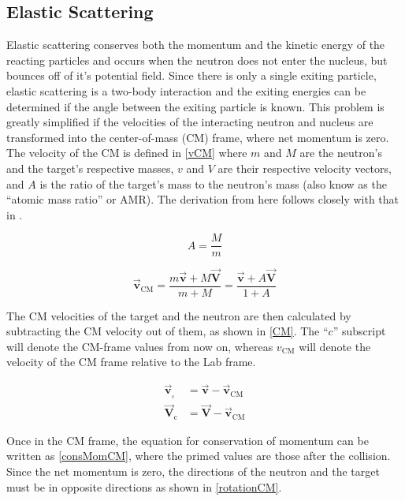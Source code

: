 \subsection{Elastic Scattering}

Elastic scattering conserves both the momentum and the kinetic energy of the reacting particles and occurs when the neutron does not enter the nucleus, but bounces off of it's potential field.  Since there is only a single exiting particle, elastic scattering is a two-body interaction and the exiting energies can be determined if the angle between the exiting particle is known.  This problem is greatly simplified if the velocities of the interacting neutron and nucleus are transformed into the center-of-mass (CM) frame, where net momentum is zero. The velocity of the CM is defined in \eqref{vCM} where $m$ and $M$ are the neutron's and the target's respective masses, $v$ and $V$ are their respective velocity vectors, and $A$ is the ratio of the target's mass to the neutron's mass (also know as the ``atomic mass ratio'' or AMR).  The derivation from here follows closely with that in \cite{jaakko}.

\begin{equation}
A = \frac{M}{m}
\label{AWR}
\end{equation}

\begin{equation}
\boldsymbol{\vec{v}_{\mathrm{CM}}} = \frac{ m \boldsymbol{\vec{v}} + M \boldsymbol{\vec{V}} }    {m+M} = \frac{ \boldsymbol{\vec{v}} + A \boldsymbol{\vec{V}} }    {1+A}
\label{vCM}
\end{equation}

The CM velocities of the target and the neutron are then calculated by subtracting the CM velocity out of them, as shown in \eqref{CM}.  The ``$c$'' subscript will denote the CM-frame values from now on, whereas $v_{\mathrm{CM}}$ will denote the velocity of the CM frame relative to the Lab frame.

\begin{equation}
\begin{split}
 \boldsymbol{\vec{v}_{_\mathrm{c}}} &= \boldsymbol{\vec{v}} - \boldsymbol{\vec{v}_{\mathrm{CM}}} \\  
 \boldsymbol{\vec{V}_{\mathrm{c}}} &= \boldsymbol{\vec{V}} - \boldsymbol{\vec{v}_{\mathrm{CM}}}
 \end{split}
\label{CM}
\end{equation}

Once in the CM frame, the equation for conservation of momentum can be written as \eqref{consMomCM}, where the primed values are those after the collision.  Since the net momentum is zero, the directions of the neutron and the target must be in opposite directions as shown in \eqref{rotationCM}.

